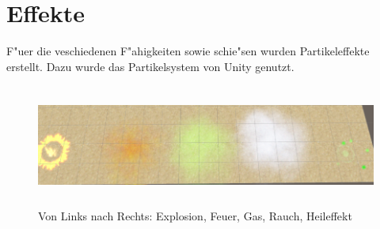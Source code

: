 \chapter{Effekte}
F"uer die veschiedenen F"ahigkeiten sowie schie"sen wurden Partikeleffekte erstellt.
Dazu wurde das Partikelsystem von Unity genutzt.

\begin{figure}
	\centering
	\includegraphics[height=4cm]{images/Partikeleffekte.png}
	\caption{Von Links nach Rechts: Explosion, Feuer, Gas, Rauch, Heileffekt}
	\label{fig:Effekte}
\end{figure}
